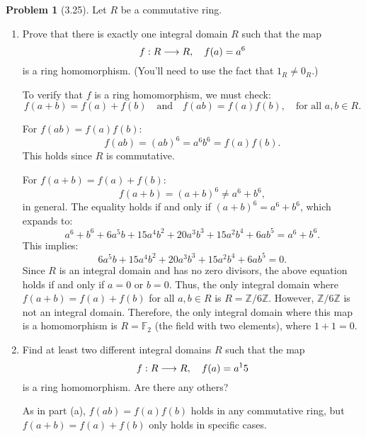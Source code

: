 \documentclass[12pt]{article}
\theoremstyle{definition}
\newtheorem{problem}{Problem}
\begin{document}
\begin{problem}[3.25]
    Let $R$ be a commutative ring.
    \begin{enumerate}[label=(\alph*)]
        \item Prove that there is exactly one integral domain $R$ such that the map
        \[
            f : R \longrightarrow R, \hspace{10px} f(a) = a^6
        \]
        is a ring homomorphism. (You'll need to use the fact that $1_R \neq 0_R$.)

        \begin{solution}
            To verify that $f$ is a ring homomorphism, we must check:
            \[
            f(a + b) = f(a) + f(b) \quad \text{and} \quad f(ab) = f(a)f(b), \quad \text{for all } a, b \in R.
            \]
            
            For $f(ab) = f(a)f(b)$:
            \[
            f(ab) = (ab)^6 = a^6b^6 = f(a)f(b).
            \]
            This holds since $R$ is commutative.
            
            For $f(a + b) = f(a) + f(b)$:
            \[
            f(a + b) = (a + b)^6 \neq a^6 + b^6,
            \]
            in general. The equality holds if and only if $(a + b)^6 = a^6 + b^6$, which expands to:
            \[
            a^6 + b^6 + 6a^5b + 15a^4b^2 + 20a^3b^3 + 15a^2b^4 + 6ab^5 = a^6 + b^6.
            \]
            This implies:
            \[
            6a^5b + 15a^4b^2 + 20a^3b^3 + 15a^2b^4 + 6ab^5 = 0.
            \]
            Since $R$ is an integral domain and has no zero divisors, the above equation holds if and only if $a = 0$ or $b = 0$. Thus, the only integral domain where $f(a + b) = f(a) + f(b)$ for all $a, b \in R$ is $R = \mathbb{Z}/6\mathbb{Z}$. However, $\mathbb{Z}/6\mathbb{Z}$ is not an integral domain. Therefore, the only integral domain where this map is a homomorphism is $R = \mathbb{F}_2$ (the field with two elements), where $1 + 1 = 0$.
            
        \end{solution}
        \item Find at least two different integral domains $R$ such that the map
        \[
            f : R \longrightarrow R, \hspace{10px} f(a) = a^15
        \]
        is a ring homomorphism. Are there any others?

        \begin{solution}
            As in part (a), $f(ab) = f(a)f(b)$ holds in any commutative ring, but $f(a + b) = f(a) + f(b)$ only holds in specific cases.


\end{solution}
\end{enumerate}
\end{problem}
\end{document}
